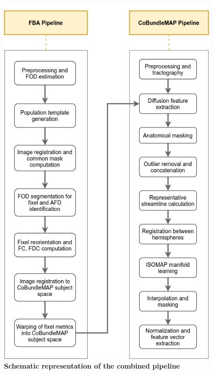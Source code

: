 \documentclass[thesis.tex]{subfiles}
\begin{document}
\begin{figure}
  \centering
  \includegraphics[width=11cm,keepaspectratio]{thesis_radomskyi/images/resulting-pipeline-diagram.png}
  \caption{\textbf{Schematic representation of the combined pipeline}}
  \label{fig:resulting-pipeline-diagram}
\end{figure}

\end{document}
